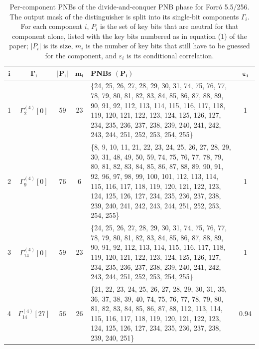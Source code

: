 \documentclass[a4paper]{article}
\newlength{\oprule}\setlength{\oprule}{0.7pt}
\newcommand{\Forro}{Forr\'o\xspace}
\begin{document}
\begin{table}[H]
\centering
\renewcommand{\arraystretch}{1.6}
\setlength{\tabcolsep}{8pt}
\caption{Per-component PNBs of the divide-and-conquer PNB phase for \Forro 5.5/256. The output mask of the distinguisher is split into its single-bit components $\Gamma_i$. For each component $i$, $P_i$ is the set of key bits that are neutral for that component alone, listed with the key bits numbered as in equation (1) of the paper; $|P_i|$ is its size, $m_i$ is the number of key bits that still have to be guessed for the component, and $\varepsilon_i$ is its conditional correlation.}
\label{app:pnbtab-55}
\begin{tabular}{@{}cccc p{8cm} c@{}}
\toprule
$\boldsymbol{i}$ & $\boldsymbol{\Gamma_i}$ & $\boldsymbol{|P_i|}$ & $\boldsymbol{m_i}$ & \textbf{PNBs $(\boldsymbol{P_i})$} & $\boldsymbol{\varepsilon_i}$ \\
\midrule
1 & $\Gamma^{(4)}_{2}[0]$ & 59 & 23 &
\{24, 25, 26, 27, 28, 29, 30, 31, 74, 75, 76, 77, 78, 79, 80, 81, 82, 83, 84, 85, 86, 87, 88, 89, 90, 91, 92, 112, 113, 114, 115, 116, 117, 118, 119, 120, 121, 122, 123, 124, 125, 126, 127, 234, 235, 236, 237, 238, 239, 240, 241, 242, 243, 244, 251, 252, 253, 254, 255\} & 1 \\
\midrule
2 & $\Gamma^{(4)}_{9}[0]$ & 76 & 6 &
\{8, 9, 10, 11, 21, 22, 23, 24, 25, 26, 27, 28, 29, 30, 31, 48, 49, 50, 59, 74, 75, 76, 77, 78, 79, 80, 81, 82, 83, 84, 85, 86, 87, 88, 89, 90, 91, 92, 96, 97, 98, 99, 100, 101, 112, 113, 114, 115, 116, 117, 118, 119, 120, 121, 122, 123, 124, 125, 126, 127, 234, 235, 236, 237, 238, 239, 240, 241, 242, 243, 244, 251, 252, 253, 254, 255\} & 1 \\
\midrule
3 & $\Gamma^{(4)}_{14}[0]$ & 59 & 23 &
\{24, 25, 26, 27, 28, 29, 30, 31, 74, 75, 76, 77, 78, 79, 80, 81, 82, 83, 84, 85, 86, 87, 88, 89, 90, 91, 92, 112, 113, 114, 115, 116, 117, 118, 119, 120, 121, 122, 123, 124, 125, 126, 127, 234, 235, 236, 237, 238, 239, 240, 241, 242, 243, 244, 251, 252, 253, 254, 255\} & 1 \\
\midrule
4 & $\Gamma^{(4)}_{14}[27]$ & 56 & 26 &
\{21, 22, 23, 24, 25, 26, 27, 28, 29, 30, 31, 35, 36, 37, 38, 39, 40, 74, 75, 76, 77, 78, 79, 80, 81, 82, 83, 84, 85, 86, 87, 88, 112, 113, 114, 115, 116, 117, 118, 119, 120, 121, 122, 123, 124, 125, 126, 127, 234, 235, 236, 237, 238, 239, 240, 251\} & 0.94 \\
\bottomrule
\end{tabular}
\end{table}
\end{document}
